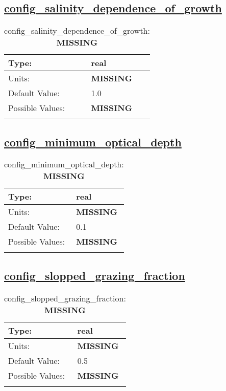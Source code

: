 \subsection[config\_salinity\_dependence\_of\_growth]{\hyperref[sec:nm_tab_biogeochemistry]{config\_salinity\_dependence\_of\_growth}}
\label{subsec:nm_sec_config_salinity_dependence_of_growth}
\begin{center}
\begin{longtable}{| p{2.0in} || p{4.0in} |}
    \hline
    Type: & real \\
    \hline
    Units: & {\bf \color{red} MISSING} \\
    \hline
    Default Value: & 1.0 \\
    \hline
    Possible Values: & {\bf \color{red} MISSING} \\
    \hline
    \caption{config\_salinity\_dependence\_of\_growth: {\bf \color{red} MISSING}}
\end{longtable}
\end{center}
\subsection[config\_minimum\_optical\_depth]{\hyperref[sec:nm_tab_biogeochemistry]{config\_minimum\_optical\_depth}}
\label{subsec:nm_sec_config_minimum_optical_depth}
\begin{center}
\begin{longtable}{| p{2.0in} || p{4.0in} |}
    \hline
    Type: & real \\
    \hline
    Units: & {\bf \color{red} MISSING} \\
    \hline
    Default Value: & 0.1 \\
    \hline
    Possible Values: & {\bf \color{red} MISSING} \\
    \hline
    \caption{config\_minimum\_optical\_depth: {\bf \color{red} MISSING}}
\end{longtable}
\end{center}
\subsection[config\_slopped\_grazing\_fraction]{\hyperref[sec:nm_tab_biogeochemistry]{config\_slopped\_grazing\_fraction}}
\label{subsec:nm_sec_config_slopped_grazing_fraction}
\begin{center}
\begin{longtable}{| p{2.0in} || p{4.0in} |}
    \hline
    Type: & real \\
    \hline
    Units: & {\bf \color{red} MISSING} \\
    \hline
    Default Value: & 0.5 \\
    \hline
    Possible Values: & {\bf \color{red} MISSING} \\
    \hline
    \caption{config\_slopped\_grazing\_fraction: {\bf \color{red} MISSING}}
\end{longtable}
\end{center}
